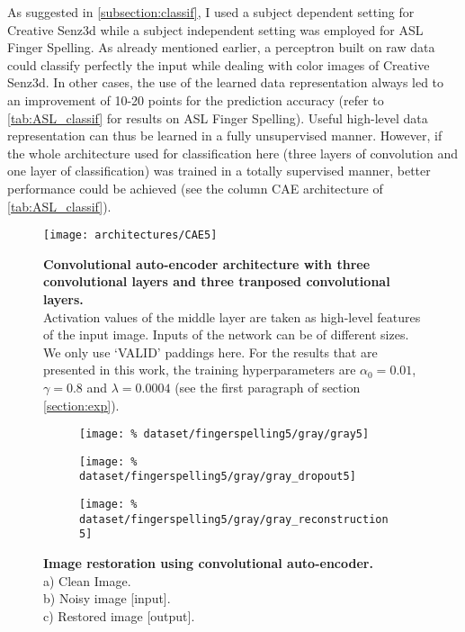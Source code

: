 As suggested in \ref{subsection:classif}, I used a subject dependent setting
for Creative Senz3d while a subject independent setting was employed
for ASL Finger Spelling. As already mentioned earlier, a perceptron built
on raw data could classify perfectly the input while dealing with color
images of Creative Senz3d. In other cases, the use of the learned
data representation always led to an improvement of 10-20 points for
the prediction accuracy (refer to \autoref{tab:ASL_classif}
for results on ASL Finger Spelling). Useful high-level data representation
can thus be learned in a fully unsupervised manner.
However, if the whole architecture used for classification here (three
layers of convolution and one layer of classification) was trained in a
totally supervised manner, better performance could be achieved
(see the column CAE architecture of \autoref{tab:ASL_classif}).

\vspace{-1em}
\begin{figure}[H]
  \centering
  \texttt{[image: architectures/CAE5]}
  \caption{%
    \textbf{Convolutional auto-encoder architecture with 
      three convolutional layers and three tranposed convolutional
      layers.}\\[0.1em]
    Activation values of the middle layer are taken as 
      high-level features of the input image. Inputs of the network
      can be of different sizes. We only use `VALID' paddings here.
      For the results that are presented in this work, the training
      hyperparameters are $\alpha_0 = 0.01$, $\gamma = 0.8$ and
      $\lambda = 0.0004$ (see the first paragraph of section
      \ref{section:exp}).
      }
  \label{fig:CAE5}
\end{figure}

\begin{figure}[H]
  \centering
  \hfill
  \begin{subfigure}{0.28\linewidth}
    \centering
    \texttt{[image: \%
      dataset/fingerspelling5/gray/gray5]}
    \caption{}
  \end{subfigure}
  \hfill
  \begin{subfigure}{0.28\linewidth}
    \centering
    \texttt{[image: \%
      dataset/fingerspelling5/gray/gray\_dropout5]}
    \caption{}
  \end{subfigure}
  \hfill
  \begin{subfigure}{0.28\linewidth}
    \centering
    \texttt{[image: \%
      dataset/fingerspelling5/gray/gray\_reconstruction5]}
    \caption{}
  \end{subfigure}
  \caption{%
    \textbf{Image restoration using convolutional auto-encoder.}\\[0.1em]
      a) Clean Image.\\[0.1em]
      b) Noisy image [input].\\[0.1em]
      c) Restored image [output].}
  \label{fig:image_restoration}
\end{figure}

